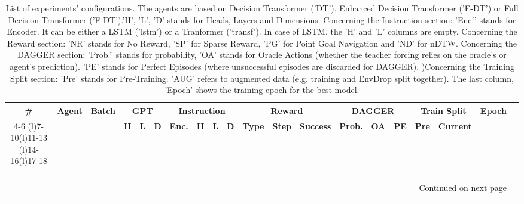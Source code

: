 \begin{longtable}{@{\hskip3pt}c@{\hskip3pt}c@{\hskip3pt}c@{\hskip3pt}c@{\hskip3pt}c@{\hskip3pt}c@{\hskip3pt}c@{\hskip3pt}c@{\hskip3pt}c@{\hskip3pt}c@{\hskip3pt}c@{\hskip3pt}c@{\hskip3pt}c@{\hskip3pt}c@{\hskip3pt}c@{\hskip3pt}c@{\hskip3pt}c@{\hskip3pt}c@{\hskip3pt}c@{\hskip3pt}c}
\caption{List of experiments' configurations. \newline The agents are based on Decision Transformer ('DT'), Enhanced Decision Transformer ('E-DT') or Full Decision Transformer ('F-DT').\newline 'H', 'L', 'D' stands for Heads, Layers and Dimensions. \newline Concerning the Instruction section: 'Enc.'' stands for Encoder. It can be either a LSTM ('lstm') or a Tranformer ('transf'). In case of LSTM, the 'H' and 'L' columns are empty. \newline Concerning the Reward section: ’NR’ stands for No Reward, ’SP’ for Sparse Reward, ’PG’ for Point Goal Navigation and ’ND’ for nDTW.  \newline Concerning the DAGGER section: 'Prob.'' stands for probability, 'OA' stands for Oracle Actions (whether the teacher forcing relies on the oracle's or agent's prediction). 'PE' stands for Perfect Episodes (where unsuccessful episodes are discarded for DAGGER). )\newline Concerning the Training Split section: 'Pre' stands for Pre-Training. 'AUG' refers to augmented data (e.g. training and EnvDrop split together). The last column, 'Epoch' shows the training epoch for the best model.}\\
\toprule
\textbf{\#} & \textbf{Agent} & \textbf{Batch} & \multicolumn{3}{c}{\textbf{GPT}} & \multicolumn{4}{c}{\textbf{Instruction}} & \multicolumn{3}{c}{\textbf{Reward}} & \multicolumn{3}{c}{\textbf{DAGGER}} & \multicolumn{2}{c}{\textbf{Train Split}} & \textbf{Epoch} \\
\cmidrule(l){4-6} \cmidrule(l){7-10}\cmidrule(l){11-13} \cmidrule(l){14-16}\cmidrule(l){17-18} \textbf{~} &     \textbf{~} &     \textbf{~} &   \textbf{H} & \textbf{L} & \textbf{D} &        \textbf{Enc.} & \textbf{H} & \textbf{L} & \textbf{D} &   \textbf{Type} & \textbf{Step} & \textbf{Success} &  \textbf{Prob.} & \textbf{OA} & \textbf{PE} &         \textbf{Pre} & \textbf{Current} &     \textbf{~} \\
\midrule
\endhead
\midrule
\multicolumn{19}{r}{{Continued on next page}} \\
\midrule
\endfoot


\end{longtable}
